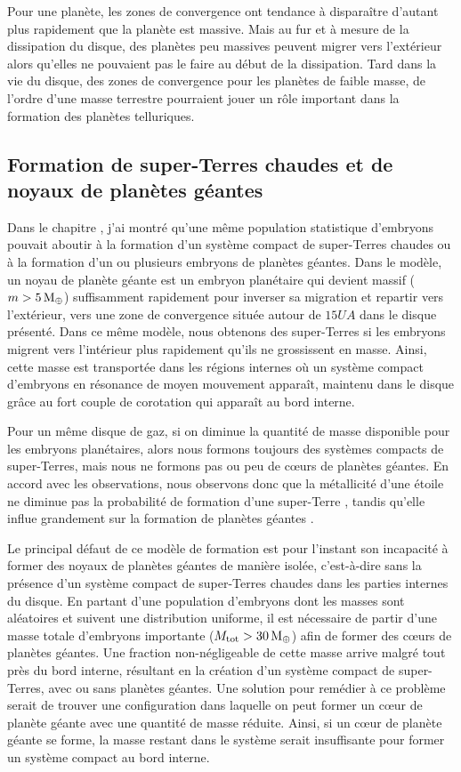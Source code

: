 Pour une planète, les zones de convergence ont tendance à disparaître d'autant plus rapidement que la planète est massive. Mais au fur et à mesure de la dissipation du disque, des planètes peu massives peuvent migrer vers l'extérieur alors qu'elles ne pouvaient pas le faire au début de la dissipation. Tard dans la vie du disque, des zones de convergence pour les planètes de faible masse, de l'ordre d'une masse terrestre pourraient jouer un rôle important dans la formation des planètes telluriques.

\subsection{Formation de super-Terres chaudes et de noyaux de planètes géantes}
Dans le chapitre , j'ai montré qu'une même population statistique d'embryons pouvait aboutir à la formation d'un système compact de super-Terres chaudes ou à la formation d'un ou plusieurs embryons de planètes géantes. Dans le modèle, un noyau de planète géante est un embryon planétaire qui devient massif ($m>5\mathrm{\thinspace M_\oplus}$) suffisamment rapidement pour inverser sa migration et repartir vers l'extérieur, vers une zone de convergence située autour de $15\unit{UA}$ dans le disque présenté. Dans ce même modèle, nous obtenons des super-Terres si les embryons migrent vers l'intérieur plus rapidement qu'ils ne grossissent en masse. Ainsi, cette masse est transportée dans les régions internes où un système compact d'embryons en résonance de moyen mouvement apparaît, maintenu dans le disque grâce au fort couple de corotation qui apparaît au bord interne.

Pour un même disque de gaz, si on diminue la quantité de masse disponible pour les embryons planétaires, alors nous formons
toujours des systèmes compacts de super-Terres, mais nous ne formons pas ou peu de cœurs de planètes géantes. En accord avec les
observations, nous observons donc que la métallicité d'une étoile ne diminue pas la probabilité de formation d'une super-Terre
\citep{howard2012occurrence}, tandis qu'elle influe grandement sur la formation de planètes géantes \citep{johnson2007new}. 

\bigskip

Le principal défaut de ce modèle de formation est pour l'instant son incapacité à former des noyaux de planètes géantes de manière isolée, c'est-à-dire sans la présence d'un système compact de super-Terres chaudes dans les parties internes du disque. En partant d'une population d'embryons dont les masses sont aléatoires et suivent une distribution uniforme, il est nécessaire de partir d'une masse totale d'embryons importante ($M_\text{tot}>30\mathrm{\thinspace M_\oplus}$) afin de former des cœurs de planètes géantes. Une fraction non-négligeable de cette masse arrive malgré tout près du bord interne, résultant en la création d'un système compact de super-Terres, avec ou sans planètes géantes. Une solution pour remédier à ce problème serait de trouver une configuration dans laquelle on peut former un cœur de planète géante avec une quantité de masse réduite. Ainsi, si un cœur de planète géante se forme, la masse restant dans le système serait insuffisante pour former un système compact au bord interne. 

